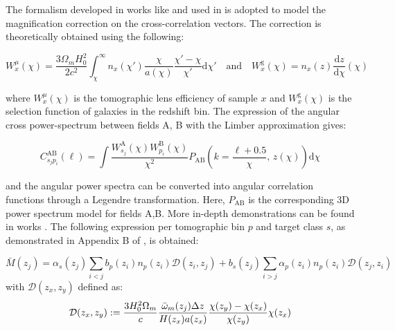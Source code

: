The formalism developed in works like \cite{DES2021Krause} and used in \cite{Gatti2018DESY1systematics,Cawthon2022DESY3Boss,Gatti2021ClusteringDESWLsrcDistrib,EuclidClusterRedshifts2025} is adopted to model the magnification correction on the cross-correlation vectors. The correction is theoretically obtained using the following:

\begin{equation}
    W^\mu_x(\chi) = \frac{3 \Omega_m H_0^2}{2 c^2} \int_{\chi}^{\infty} n_x(\chi')\frac{\chi}{a(\chi)}\frac{\chi'-\chi}{\chi'}\mathrm{d}\chi'\quad\text{and}\quad W^\mathrm{g}_x(\chi)=n_x(z)\frac{\mathrm{d}z}{\mathrm{d}\chi}(\chi)
\end{equation}

where $W^\mu_x(\chi)$ is the tomographic lens efficiency of sample $x$ and $W^\mathrm{g}_x(\chi)$ is the selection function of galaxies in the redshift bin. The expression of the angular cross power-spectrum between fields A, B with the Limber approximation \cite{Limber1953Approximation} gives:

\begin{equation}
    C_{s_jp_i}^{\mathrm{AB}}(\ell) = \int \frac{W^\mathrm{A}_{s_j}(\chi) W^\mathrm{B}_{p_i}(\chi)}{\chi^2}P_{\mathrm{AB}}\left(k = \frac{\ell + 0.5}{\chi},\,z(\chi)\right)\mathrm{d}\chi
\end{equation}

and the angular power spectra can be converted into angular correlation functions through a Legendre transformation. Here, $P_{\mathrm{AB}}$ is the corresponding 3D power spectrum model for fields A,B. More in-depth demonstrations can be found in works \cite{Cawthon2022DESY3Boss, EuclidClusterRedshifts2025}. The following expression per tomographic bin $p$ and target class $s$, as demonstrated in Appendix B of \cite{EuclidClusterRedshifts2025}, is obtained:

\begin{equation}
    \bar{M}(z_j) = \alpha_s(z_j) \sum_{i<j} b_p(z_i)n_p(z_i) \mathcal{D}(z_i, z_j) 
+ b_s(z_j) \sum_{i>j} \alpha_p(z_i)n_p(z_i)\mathcal{D}(z_j, z_i)
\end{equation}
with $\mathcal{D}(z_x,z_y)$ defined as:
\begin{equation}
    \mathcal{D}(z_x,z_y):=\frac{3H_0^2\Omega_m}{c}\frac{\bar{\omega}_m(z_j)\Delta z}{H(z_x)a(z_x)}\frac{\chi(z_y)-\chi(z_x)}{\chi(z_y)}\chi(z_x)
\end{equation}

